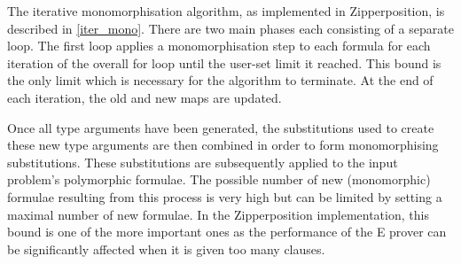 \documentclass[]{ceurart}
\begin{document}
The iterative monomorphisation algorithm, as implemented in Zipperposition, is described in \ref{iter_mono}. There are two main phases each consisting of a separate loop. The first loop applies a monomorphisation step to each formula for each iteration of the overall for loop until the user-set limit it reached. This bound is the only limit which is necessary for the algorithm to terminate. At the end of each iteration, the old and new maps are updated.

Once all type arguments have been generated, the substitutions used to create these new type arguments are then combined in order to form monomorphising substitutions. These substitutions are subsequently applied to the input problem's polymorphic formulae. The possible number of new (monomorphic) formulae resulting from this process is very high but can be limited by setting a maximal number of new formulae. In the Zipperposition implementation, this bound is one of the more important ones as the performance of the E prover can be significantly affected when it is given too many clauses.
\end{document}
